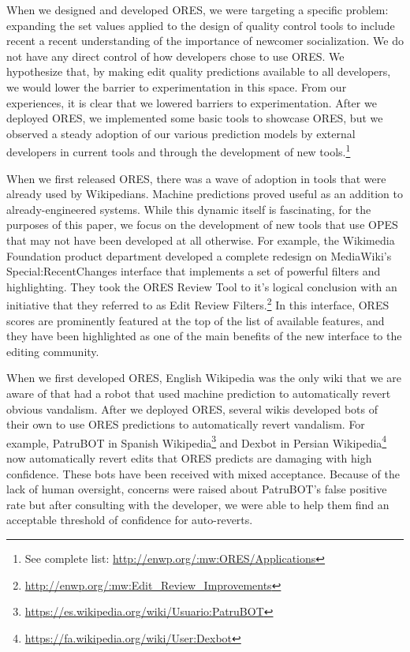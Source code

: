 When we designed and developed ORES, we were targeting a specific problem: expanding the set values applied to the design of quality control tools to include recent a recent understanding of the importance of newcomer socialization.  We do not have any direct control of how developers chose to use ORES.  We hypothesize that, by making edit quality predictions available to all developers, we would lower the barrier to experimentation in this space.  From our experiences, it is clear that we lowered barriers to experimentation.  After we deployed ORES, we implemented some basic tools to showcase ORES, but we observed a steady adoption of our various prediction models by external developers in current tools and through the development of new tools.\footnote{See complete list: \url{http://enwp.org/:mw:ORES/Applications}}

When we first released ORES, there was a wave of adoption in tools that were already used by Wikipedians.  Machine predictions proved useful as an addition to already-engineered systems.  While this dynamic itself is fascinating, for the purposes of this paper, we focus on the development of new tools that use OPES that may not have been developed at all otherwise.  For example, the Wikimedia Foundation product department developed a complete redesign on MediaWiki's Special:RecentChanges interface that implements a set of powerful filters and highlighting.  They took the ORES Review Tool to it's logical conclusion with an initiative that they referred to as Edit Review Filters.\footnote{\url{http://enwp.org/:mw:Edit_Review_Improvements}}  In this interface, ORES scores are prominently featured at the top of the list of available features, and they have been highlighted as one of the main benefits of the new interface to the editing community.

When we first developed ORES, English Wikipedia was the only wiki that we are aware of that had a robot that used machine prediction to automatically revert obvious vandalism\cite{carter2008cluebot}.  After we deployed ORES, several wikis developed bots of their own to use ORES predictions to automatically revert vandalism.  For example, PatruBOT in Spanish Wikipedia\footnote{\url{https://es.wikipedia.org/wiki/Usuario:PatruBOT}} and Dexbot in Persian Wikipedia\footnote{\url{https://fa.wikipedia.org/wiki/User:Dexbot}} now automatically revert edits that ORES predicts are damaging with high confidence.  These bots have been received with mixed acceptance.  Because of the lack of human oversight, concerns were raised about PatruBOT's false positive rate but after consulting with the developer, we were able to help them find an acceptable threshold of confidence for auto-reverts.

